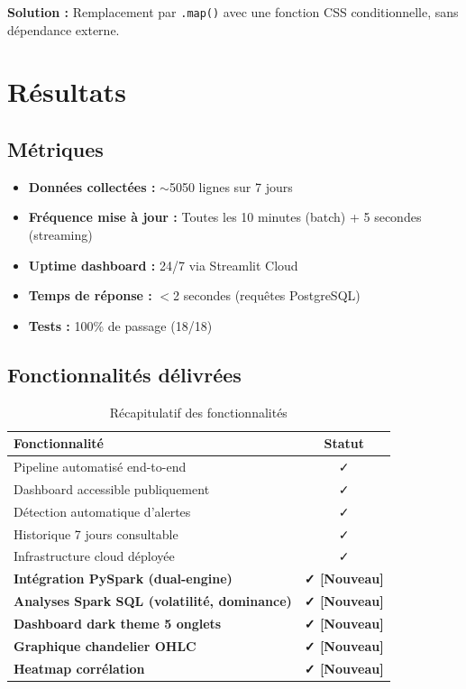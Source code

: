 \documentclass[12pt,a4paper]{article}
\begin{document}
\textbf{Solution :} Remplacement par \texttt{.map()} avec une fonction CSS conditionnelle, sans dépendance externe.

\section{Résultats}

\subsection{Métriques}
\begin{itemize}[noitemsep]
    \item \textbf{Données collectées :} $\sim$5050 lignes sur 7 jours
    \item \textbf{Fréquence mise à jour :} Toutes les 10 minutes (batch) + 5 secondes (streaming)
    \item \textbf{Uptime dashboard :} 24/7 via Streamlit Cloud
    \item \textbf{Temps de réponse :} $<$2 secondes (requêtes PostgreSQL)
    \item \textbf{Tests :} 100\% de passage (18/18)
\end{itemize}

\subsection{Fonctionnalités délivrées}

\begin{table}[H]
\centering
\begin{tabular}{|l|c|}
\hline
\textbf{Fonctionnalité} & \textbf{Statut} \\
\hline
Pipeline automatisé end-to-end & ✓ \\
\hline
Dashboard accessible publiquement & ✓ \\
\hline
Détection automatique d'alertes & ✓ \\
\hline
Historique 7 jours consultable & ✓ \\
\hline
Infrastructure cloud déployée & ✓ \\
\hline
\textbf{Intégration PySpark (dual-engine)} & \textbf{✓ [Nouveau]} \\
\hline
\textbf{Analyses Spark SQL (volatilité, dominance)} & \textbf{✓ [Nouveau]} \\
\hline
\textbf{Dashboard dark theme 5 onglets} & \textbf{✓ [Nouveau]} \\
\hline
\textbf{Graphique chandelier OHLC} & \textbf{✓ [Nouveau]} \\
\hline
\textbf{Heatmap corrélation} & \textbf{✓ [Nouveau]} \\
\hline
\end{tabular}
\caption{Récapitulatif des fonctionnalités}
\end{table}
\end{document}
